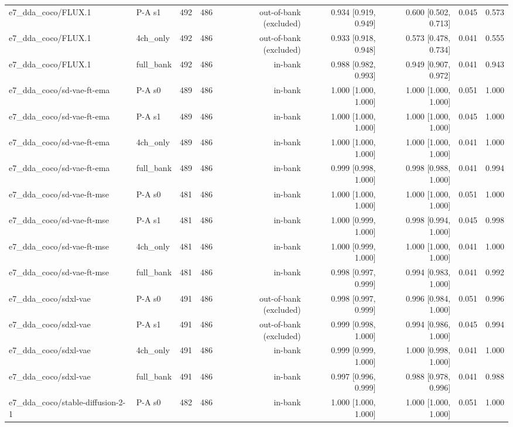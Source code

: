\begin{table}[htbp]
\begin{tabular}{llrrrrrrr}
e7\_dda\_coco/FLUX.1 & P-A s1 & 492 & 486 & out-of-bank (excluded) & 0.934 [0.919, 0.949] & 0.600 [0.502, 0.713] & 0.045 & 0.573 \\
e7\_dda\_coco/FLUX.1 & 4ch\_only & 492 & 486 & out-of-bank (excluded) & 0.933 [0.918, 0.948] & 0.573 [0.478, 0.734] & 0.041 & 0.555 \\
e7\_dda\_coco/FLUX.1 & full\_bank & 492 & 486 & in-bank & 0.988 [0.982, 0.993] & 0.949 [0.907, 0.972] & 0.041 & 0.943 \\
e7\_dda\_coco/sd-vae-ft-ema & P-A s0 & 489 & 486 & in-bank & 1.000 [1.000, 1.000] & 1.000 [1.000, 1.000] & 0.051 & 1.000 \\
e7\_dda\_coco/sd-vae-ft-ema & P-A s1 & 489 & 486 & in-bank & 1.000 [1.000, 1.000] & 1.000 [1.000, 1.000] & 0.045 & 1.000 \\
e7\_dda\_coco/sd-vae-ft-ema & 4ch\_only & 489 & 486 & in-bank & 1.000 [1.000, 1.000] & 1.000 [1.000, 1.000] & 0.041 & 1.000 \\
e7\_dda\_coco/sd-vae-ft-ema & full\_bank & 489 & 486 & in-bank & 0.999 [0.998, 1.000] & 0.998 [0.988, 1.000] & 0.041 & 0.994 \\
e7\_dda\_coco/sd-vae-ft-mse & P-A s0 & 481 & 486 & in-bank & 1.000 [1.000, 1.000] & 1.000 [1.000, 1.000] & 0.051 & 1.000 \\
e7\_dda\_coco/sd-vae-ft-mse & P-A s1 & 481 & 486 & in-bank & 1.000 [0.999, 1.000] & 0.998 [0.994, 1.000] & 0.045 & 0.998 \\
e7\_dda\_coco/sd-vae-ft-mse & 4ch\_only & 481 & 486 & in-bank & 1.000 [0.999, 1.000] & 1.000 [1.000, 1.000] & 0.041 & 1.000 \\
e7\_dda\_coco/sd-vae-ft-mse & full\_bank & 481 & 486 & in-bank & 0.998 [0.997, 0.999] & 0.994 [0.983, 1.000] & 0.041 & 0.992 \\
e7\_dda\_coco/sdxl-vae & P-A s0 & 491 & 486 & out-of-bank (excluded) & 0.998 [0.997, 0.999] & 0.996 [0.984, 1.000] & 0.051 & 0.996 \\
e7\_dda\_coco/sdxl-vae & P-A s1 & 491 & 486 & out-of-bank (excluded) & 0.999 [0.998, 1.000] & 0.994 [0.986, 1.000] & 0.045 & 0.994 \\
e7\_dda\_coco/sdxl-vae & 4ch\_only & 491 & 486 & in-bank & 0.999 [0.999, 1.000] & 1.000 [0.998, 1.000] & 0.041 & 1.000 \\
e7\_dda\_coco/sdxl-vae & full\_bank & 491 & 486 & in-bank & 0.997 [0.996, 0.999] & 0.988 [0.978, 0.996] & 0.041 & 0.988 \\
e7\_dda\_coco/stable-diffusion-2-1 & P-A s0 & 482 & 486 & in-bank & 1.000 [1.000, 1.000] & 1.000 [1.000, 1.000] & 0.051 & 1.000 \\

\end{tabular}
\end{table}

